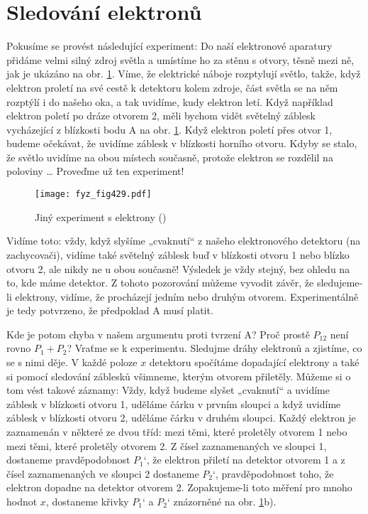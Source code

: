   \section{Sledování elektronů}\label{fyz:IchapXXXVIIsecVI}
    Pokusíme se provést následující experiment: Do naší elektronové aparatury přidáme velmi silný
    zdroj světla a umístíme ho za stěnu s otvory, těsně mezi ně, jak je ukázáno na obr.
    \ref{fyz:fig429}. Víme, že elektrické náboje rozptylují světlo, takže, když elektron proletí na
    své cestě k detektoru kolem zdroje, část světla se na něm rozptýlí i do našeho oka, a tak
    uvidíme, kudy elektron letí. Když například elektron poletí po dráze otvorem 2, měli bychom
    vidět světelný záblesk vycházející z blízkosti bodu A na obr. \ref{fyz:fig429}. Když elektron
    poletí přes otvor 1, budeme očekávat, že uvidíme záblesk v blízkosti horního otvoru. Kdyby se
    stalo, že světlo uvidíme na obou místech současně, protože elektron se rozdělil na poloviny …
    Proveďme už ten experiment!
    \begin{figure}[ht!] %
      \centering
      \texttt{[image: fyz\_fig429.pdf]}
      \caption{Jiný experiment s elektrony (\cite[s.~697]{Feynman01})}
      \label{fyz:fig429}
    \end{figure}

    Vidíme toto: vždy, když slyšíme „cvaknutí“ z našeho elektronového detektoru (na zachycovači),
    vidíme také světelný záblesk buď v blízkosti otvoru 1 nebo blízko otvoru 2, ale nikdy ne u obou
    současně! Výsledek je vždy stejný, bez ohledu na to, kde máme detektor. Z tohoto pozorování
    můžeme vyvodit závěr, že sledujeme-li elektrony, vidíme, že procházejí jedním nebo druhým
    otvorem. Experimentálně je tedy potvrzeno, že předpoklad A musí platit.
    
    Kde je potom chyba v našem argumentu proti tvrzení A? Proč prostě \(P_{12}\) není rovno
    \(P_1+P_2\)? Vraťme se k experimentu. Sledujme dráhy elektronů a zjistíme, co se s nimi děje. V
    každé poloze \(x\) detektoru spočítáme dopadající elektrony a také si pomocí sledování záblesků
    všimneme, kterým otvorem přiletěly. Můžeme si o tom vést takové záznamy: Vždy, když budeme
    slyšet „cvaknutí“ a uvidíme záblesk v blízkosti otvoru 1, uděláme čárku v prvním sloupci a když
    uvidíme záblesk v blízkosti otvoru 2, uděláme čárku v druhém sloupci. Každý elektron je
    zaznamenán v některé ze dvou tříd: mezi těmi, které proletěly otvorem 1 nebo mezi těmi, které
    proletěly otvorem 2. Z čísel zaznamenaných ve sloupci 1, dostaneme pravděpodobnost \(P_1‘\), že
    elektron přiletí na detektor otvorem 1 a z čísel zaznamenaných ve sloupci 2 dostaneme \(P_2‘\),
    pravděpodobnost toho, že elektron dopadne na detektor otvorem 2. Zopakujeme-li toto měření pro
    mnoho hodnot \(x\), dostaneme křivky \(P_1‘\) a \(P_2‘\) znázorněné na obr. \ref{fyz:fig429}b).
    
